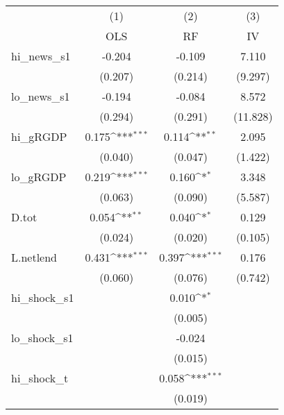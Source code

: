 {
\def\sym#1{\ifmmode^{#1}\else\(^{#1}\)\fi}
\begin{tabular}{l*{3}{c}}
\toprule
            &\multicolumn{1}{c}{(1)}&\multicolumn{1}{c}{(2)}&\multicolumn{1}{c}{(3)}\\
            &\multicolumn{1}{c}{OLS}&\multicolumn{1}{c}{RF}&\multicolumn{1}{c}{IV}\\
\midrule
hi\_news\_s1  &      -0.204         &      -0.109         &       7.110         \\
            &     (0.207)         &     (0.214)         &     (9.297)         \\
\addlinespace
lo\_news\_s1  &      -0.194         &      -0.084         &       8.572         \\
            &     (0.294)         &     (0.291)         &    (11.828)         \\
\addlinespace
hi\_gRGDP    &       0.175\sym{***}&       0.114\sym{**} &       2.095         \\
            &     (0.040)         &     (0.047)         &     (1.422)         \\
\addlinespace
lo\_gRGDP    &       0.219\sym{***}&       0.160\sym{*}  &       3.348         \\
            &     (0.063)         &     (0.090)         &     (5.587)         \\
\addlinespace
D.tot       &       0.054\sym{**} &       0.040\sym{*}  &       0.129         \\
            &     (0.024)         &     (0.020)         &     (0.105)         \\
\addlinespace
L.netlend   &       0.431\sym{***}&       0.397\sym{***}&       0.176         \\
            &     (0.060)         &     (0.076)         &     (0.742)         \\
\addlinespace
hi\_shock\_s1 &                     &       0.010\sym{*}  &                     \\
            &                     &     (0.005)         &                     \\
\addlinespace
lo\_shock\_s1 &                     &      -0.024         &                     \\
            &                     &     (0.015)         &                     \\
\addlinespace
hi\_shock\_t  &                     &       0.058\sym{***}&                     \\
            &                     &     (0.019)         &                     \\

\end{tabular}}
